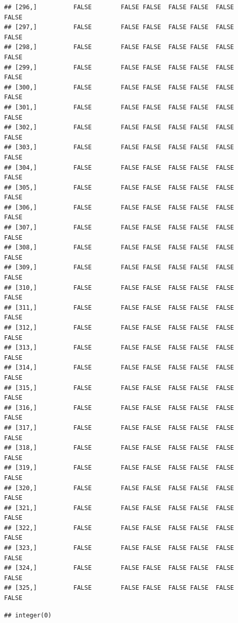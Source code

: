 \documentclass[
  english,
  man,floatsintext]{apa6}
\begin{document}
\begin{verbatim}
## [296,]          FALSE        FALSE FALSE  FALSE FALSE  FALSE            FALSE
## [297,]          FALSE        FALSE FALSE  FALSE FALSE  FALSE            FALSE
## [298,]          FALSE        FALSE FALSE  FALSE FALSE  FALSE            FALSE
## [299,]          FALSE        FALSE FALSE  FALSE FALSE  FALSE            FALSE
## [300,]          FALSE        FALSE FALSE  FALSE FALSE  FALSE            FALSE
## [301,]          FALSE        FALSE FALSE  FALSE FALSE  FALSE            FALSE
## [302,]          FALSE        FALSE FALSE  FALSE FALSE  FALSE            FALSE
## [303,]          FALSE        FALSE FALSE  FALSE FALSE  FALSE            FALSE
## [304,]          FALSE        FALSE FALSE  FALSE FALSE  FALSE            FALSE
## [305,]          FALSE        FALSE FALSE  FALSE FALSE  FALSE            FALSE
## [306,]          FALSE        FALSE FALSE  FALSE FALSE  FALSE            FALSE
## [307,]          FALSE        FALSE FALSE  FALSE FALSE  FALSE            FALSE
## [308,]          FALSE        FALSE FALSE  FALSE FALSE  FALSE            FALSE
## [309,]          FALSE        FALSE FALSE  FALSE FALSE  FALSE            FALSE
## [310,]          FALSE        FALSE FALSE  FALSE FALSE  FALSE            FALSE
## [311,]          FALSE        FALSE FALSE  FALSE FALSE  FALSE            FALSE
## [312,]          FALSE        FALSE FALSE  FALSE FALSE  FALSE            FALSE
## [313,]          FALSE        FALSE FALSE  FALSE FALSE  FALSE            FALSE
## [314,]          FALSE        FALSE FALSE  FALSE FALSE  FALSE            FALSE
## [315,]          FALSE        FALSE FALSE  FALSE FALSE  FALSE            FALSE
## [316,]          FALSE        FALSE FALSE  FALSE FALSE  FALSE            FALSE
## [317,]          FALSE        FALSE FALSE  FALSE FALSE  FALSE            FALSE
## [318,]          FALSE        FALSE FALSE  FALSE FALSE  FALSE            FALSE
## [319,]          FALSE        FALSE FALSE  FALSE FALSE  FALSE            FALSE
## [320,]          FALSE        FALSE FALSE  FALSE FALSE  FALSE            FALSE
## [321,]          FALSE        FALSE FALSE  FALSE FALSE  FALSE            FALSE
## [322,]          FALSE        FALSE FALSE  FALSE FALSE  FALSE            FALSE
## [323,]          FALSE        FALSE FALSE  FALSE FALSE  FALSE            FALSE
## [324,]          FALSE        FALSE FALSE  FALSE FALSE  FALSE            FALSE
## [325,]          FALSE        FALSE FALSE  FALSE FALSE  FALSE            FALSE
\end{verbatim}

\begin{verbatim}
## integer(0)
\end{verbatim}
\end{document}
